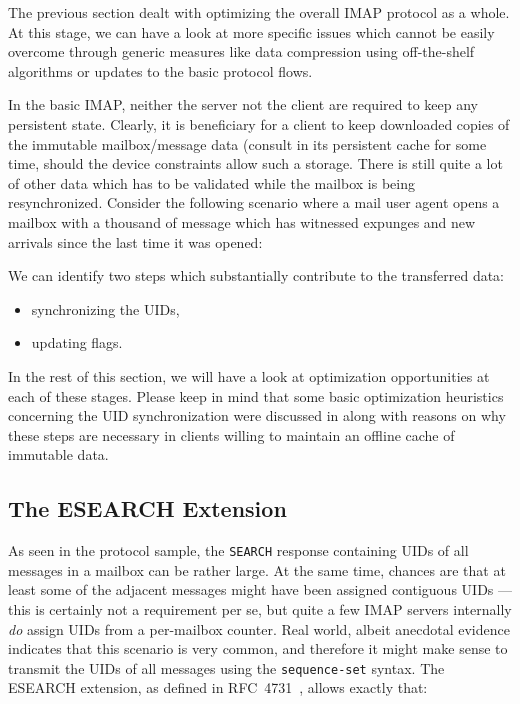 \documentclass[trojita]{subfiles}
\begin{document}
The previous section dealt with optimizing the overall IMAP protocol as a whole.  At this stage, we can have a look at
more specific issues which cannot be easily overcome through generic measures like data compression using off-the-shelf
algorithms or updates to the basic protocol flows.

In the basic IMAP, neither the server not the client are required to keep any persistent state.  Clearly, it is
beneficiary for a client to keep downloaded copies of the immutable mailbox/message data (consult
 in its persistent cache for some time, should the device constraints allow such a
storage.  There is still quite a lot of other data which has to be validated while the mailbox is being resynchronized.
Consider the following scenario where a mail user agent opens a mailbox with a thousand of message which has witnessed
expunges and new arrivals since the last time it was opened:


We can identify two steps which substantially contribute to the transferred data:

\begin{itemize}
  \item synchronizing the UIDs,
  \item updating flags.
\end{itemize}

In the rest of this section, we will have a look at optimization opportunities at each of these stages.  Please keep in
mind that some basic optimization heuristics concerning the UID synchronization were discussed in
 along with reasons on why these steps are necessary in clients willing to maintain an
offline cache of immutable data.

\subsection{The ESEARCH Extension}

As seen in the protocol sample, the {\tt SEARCH} response containing UIDs of all messages in a mailbox can be rather
large.  At the same time, chances are that at least some of the adjacent messages might have been assigned contiguous
UIDs --- this is certainly not a requirement per se, but quite a few IMAP servers internally {\em do} assign UIDs from a
per-mailbox counter.  Real world, albeit anecdotal evidence  indicates that this scenario is very common, and therefore it might make
sense to transmit the UIDs of all messages using the {\tt sequence-set} \cite[p. 89]{rfc3501} syntax.  The ESEARCH
extension, as defined in RFC~4731~\cite{rfc4731}, allows exactly that:
\end{document}
